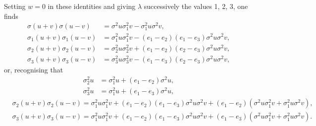 \documentclass{article}
\begin{document}
Setting $w = 0$ in these identities and giving $\lambda$ successively the values 1, 2, 3, one finds
\begin{align*}
\sigma(u + v)\sigma(u - v) &= \sigma^2u\sigma_1^2v - \sigma_1^2u\sigma^2v, \\
\sigma_1(u + v)\sigma_1(u - v) &= \sigma_1^2u\sigma_1^2v - (e_1 - e_2)(e_1 - e_3)\sigma^2u\sigma^2v, \\
\sigma_2(u + v)\sigma_2(u - v) &= \sigma_2^2u\sigma_2^2v + (e_1 - e_2)(e_2 - e_3)\sigma^2u\sigma^2v, \\
\sigma_3(u + v)\sigma_3(u - v) &= \sigma_3^2u\sigma_3^2v - (e_1 - e_3)(e_2 - e_3)\sigma^2u\sigma^2v,
\end{align*}
or, recognising that
\begin{align*}
\sigma_2^2u &= \sigma_1^2u + (e_1 - e_2)\sigma^2u, \\
\sigma_3^2u &= \sigma_1^2u + (e_1 - e_3)\sigma^2u,
\end{align*}
\begin{align*}
&\sigma_2(u + v)\sigma_2(u - v) = \sigma_1^2u\sigma_1^2v + (e_1 - e_2)(e_1 - e_3)\sigma^2u\sigma^2v + (e_1 - e_2)(\sigma^2u\sigma_1^2v + \sigma_1^2u\sigma^2v), \\
&\sigma_3(u + v)\sigma_3(u - v) = \sigma_1^2u\sigma_1^2v + (e_1 - e_2)(e_1 - e_3)\sigma^2u\sigma^2v + (e_1 - e_3)(\sigma^2u\sigma_1^2v + \sigma_1^2u\sigma^2v).
\end{align*}
\end{document}
